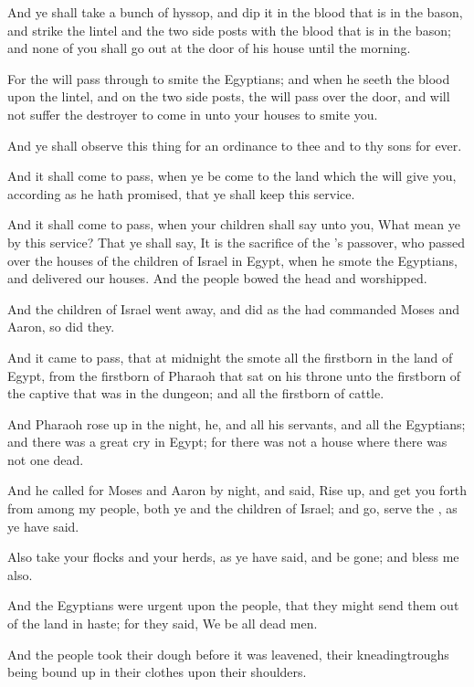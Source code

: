 \Verse And ye shall take a bunch of hyssop, and dip it in the blood that is in the bason, and strike the lintel and the two side posts with the blood that is in the bason; and none of you shall go out at the door of his house until the morning.

\Verse For the \LORD will pass through to smite the Egyptians; and when he seeth the blood upon the lintel, and on the two side posts, the \LORD will pass over the door, and will not suffer the destroyer to come in unto your houses to smite you.

\Verse And ye shall observe this thing for an ordinance to thee and to thy sons for ever.

\Verse And it shall come to pass, when ye be come to the land which the \LORD will give you, according as he hath promised, that ye shall keep this service.

\Verse And it shall come to pass, when your children shall say unto you, What mean ye by this service?  \Verse That ye shall say, It is the sacrifice of the \LORD's passover, who passed over the houses of the children of Israel in Egypt, when he smote the Egyptians, and delivered our houses. And the people bowed the head and worshipped.

\Verse And the children of Israel went away, and did as the \LORD had commanded Moses and Aaron, so did they.

\Verse And it came to pass, that at midnight the \LORD smote all the firstborn in the land of Egypt, from the firstborn of Pharaoh that sat on his throne unto the firstborn of the captive that was in the dungeon; and all the firstborn of cattle.

\Verse And Pharaoh rose up in the night, he, and all his servants, and all the Egyptians; and there was a great cry in Egypt; for there was not a house where there was not one dead.

\Verse And he called for Moses and Aaron by night, and said, Rise up, and get you forth from among my people, both ye and the children of Israel; and go, serve the \LORD, as ye have said.

\Verse Also take your flocks and your herds, as ye have said, and be gone; and bless me also.

\Verse And the Egyptians were urgent upon the people, that they might send them out of the land in haste; for they said, We be all dead men.

\Verse And the people took their dough before it was leavened, their kneadingtroughs being bound up in their clothes upon their shoulders.

